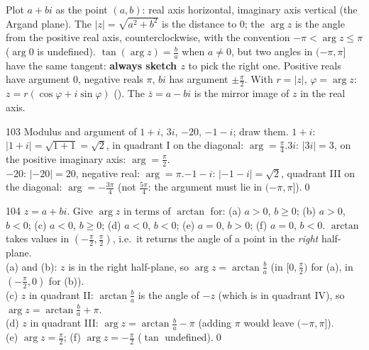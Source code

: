 \begin{key}
Plot $a+bi$ as the point $(a,b)$: real axis horizontal, imaginary axis vertical (the Argand plane). The  $|z|=\sqrt{a^2+b^2}$ is the distance to $0$; the  $\arg z$ is the angle from the positive real axis, counterclockwise, with the convention $-\pi<\arg z\le\pi$ ($\arg0$ is undefined). $\tan(\arg z)=\frac ba$ when $a\ne0$, but two angles in $(-\pi,\pi]$ have the same tangent: \textbf{always sketch $z$} to pick the right one. Positive reals have argument $0$, negative reals $\pi$, $bi$ has argument $\pm\frac\pi2$. With $r=|z|$, $\varphi=\arg z$: $z=r(\cos\varphi+i\sin\varphi)$ (). The  $\bar z=a-bi$ is the mirror image of $z$ in the real axis.
\end{key}

\begin{bookex}{103}
Modulus and argument of $1+i$, $3i$, $-20$, $-1-i$; draw them.
\solution
$1+i$: $|1+i|=\sqrt{1+1}=\sqrt2$, in quadrant I on the diagonal: $\arg=\frac\pi4$.\quad $3i$: $|3i|=3$, on the positive imaginary axis: $\arg=\frac\pi2$.\\
$-20$: $|{-20}|=20$, negative real: $\arg=\pi$.\quad $-1-i$: $|{-1-i}|=\sqrt2$, quadrant III on the diagonal: $\arg=-\frac{3\pi}4$ (not $\frac{5\pi}4$: the argument must lie in $(-\pi,\pi]$).\qed
\end{bookex}

\begin{bookex}{104}
$z=a+bi$. Give $\arg z$ in terms of $\arctan$ for: (a) $a>0$, $b\ge0$; (b) $a>0$, $b<0$; (c) $a<0$, $b\ge0$; (d) $a<0$, $b<0$; (e) $a=0$, $b>0$; (f) $a=0$, $b<0$.
\solution
$\arctan$ takes values in $(-\frac\pi2,\frac\pi2)$, i.e.\ it returns the angle of a point in the \emph{right} half-plane.\\
(a) and (b): $z$ is in the right half-plane, so $\arg z=\arctan\frac ba$ (in $[0,\frac\pi2)$ for (a), in $(-\frac\pi2,0)$ for (b)).\\
(c) $z$ in quadrant II: $\arctan\frac ba$ is the angle of $-z$ (which is in quadrant IV), so $\arg z=\arctan\frac ba+\pi$.\\
(d) $z$ in quadrant III: $\arg z=\arctan\frac ba-\pi$ (adding $\pi$ would leave $(-\pi,\pi]$).\\
(e) $\arg z=\frac\pi2$; (f) $\arg z=-\frac\pi2$ ($\tan$ undefined).\qed
\end{bookex}

